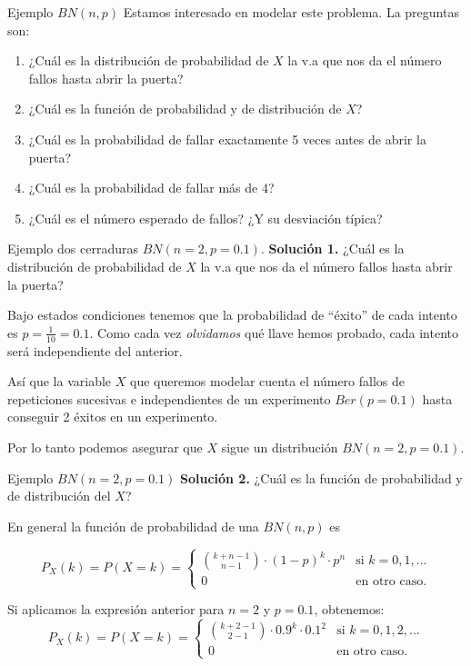 \documentclass[
  ignorenonframetext,
  aspectratio=169]{beamer}
\providecommand{\tightlist}{%
  \setlength{\itemsep}{0pt}\setlength{\parskip}{0pt}}\usepackage{longtable,booktabs,array}
\begin{document}
\begin{frame}{Ejemplo \(BN(n,p)\)}
\protect\hypertarget{ejemplo-bnnp}{}
Estamos interesado en modelar este problema. La preguntas son:

\begin{enumerate}
\tightlist
\item
  ¿Cuál es la distribución de probabilidad de \(X\) la v.a que nos da el
  número fallos hasta abrir la puerta?
\item
  ¿Cuál es la función de probabilidad y de distribución de \(X\)?
\item
  ¿Cuál es la probabilidad de fallar exactamente 5 veces antes de abrir
  la puerta?
\item
  ¿Cuál es la probabilidad de fallar más de 4?
\item
  ¿Cuál es el número esperado de fallos? ¿Y su desviación típica?
\end{enumerate}
\end{frame}

\begin{frame}{Ejemplo dos cerraduras \(BN(n=2,p=0.1)\).}
\protect\hypertarget{ejemplo-dos-cerraduras-bnn2p0.1.}{}
\textbf{Solución 1.} ¿Cuál es la distribución de probabilidad de \(X\)
la v.a que nos da el número fallos hasta abrir la puerta?

Bajo estados condiciones tenemos que la probabilidad de ``éxito'' de
cada intento es \(p=\frac{1}{10}=0.1\). Como cada vez \emph{olvidamos}
qué llave hemos probado, cada intento será independiente del anterior.

Así que la variable \(X\) que queremos modelar cuenta el número fallos
de repeticiones sucesivas e independientes de un experimento
\(Ber(p=0.1)\) hasta conseguir 2 éxitos en un experimento.

Por lo tanto podemos asegurar que \(X\) sigue un distribución
\(BN(n=2,p=0.1).\)
\end{frame}

\begin{frame}{Ejemplo \(BN(n=2,p=0.1)\)}
\protect\hypertarget{ejemplo-bnn2p0.1}{}
\textbf{Solución 2.} ¿Cuál es la función de probabilidad y de
distribución del \(X\)?

En general la función de probabilidad de una \(BN(n,p)\) es

\[
P_X(k)=P(X=k)=
\left\{
\begin{array}{cc} 
{k+n-1\choose n-1} \cdot (1-p)^{k}\cdot p^n & \mbox{si }  k=0,1,\ldots \\ 0 & \mbox{en otro caso.}\end{array}\right.
\]

Si aplicamos la expresión anterior para \(n=2\) y \(p=0.1\), obtenemos:
\[
P_X(k)=P(X=k)=
\left\{
\begin{array}{cc} 
{k+2-1\choose 2-1} \cdot 0.9^{k}\cdot 0.1^2 & \mbox{si }  k=0,1,2,\ldots \\ 0 & \mbox{en otro caso.}\end{array}\right.
\]
\end{frame}
\end{document}
